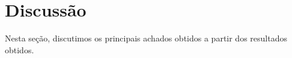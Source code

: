 \section{Discussão}\label{sec:discussao}

Nesta seção, discutimos os principais achados obtidos a partir dos resultados obtidos.


